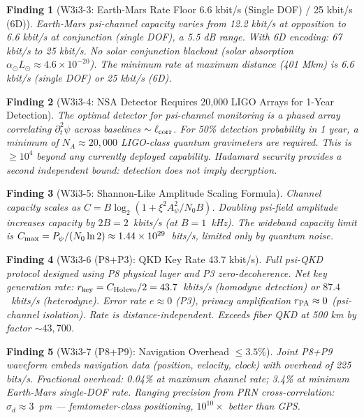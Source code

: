 \documentclass[aps,prd,twocolumn,superscriptaddress,nofootinbib]{revtex4-2}
\newtheorem{finding}{Finding}
\begin{document}
\begin{finding}[W3i3-3: Earth-Mars Rate Floor 6.6 kbit/s (Single DOF) / 25 kbit/s (6D)]
Earth-Mars psi-channel capacity varies from 12.2 kbit/s at opposition
to 6.6 kbit/s at conjunction (single DOF), a 5.5 dB range.
With 6D encoding: 67 kbit/s to 25 kbit/s. No solar conjunction blackout
(solar absorption $\alpha_\odot L_\odot \approx 4.6\times10^{-20}$).
The minimum rate at maximum distance (401 Mkm) is 6.6 kbit/s (single DOF)
or 25 kbit/s (6D).
\end{finding}

\begin{finding}[W3i3-4: NSA Detector Requires 20,000 LIGO Arrays for 1-Year Detection]
The optimal detector for psi-channel monitoring is a phased array
correlating $\partial_t^2\psi$ across baselines $\sim\ell_{\rm corr}$.
For 50\% detection probability in 1 year, a minimum of $N_A \approx 20{,}000$
LIGO-class quantum gravimeters are required. This is $\geq 10^4$ beyond
any currently deployed capability. Hadamard security provides a second
independent bound: detection does not imply decryption.
\end{finding}

\begin{finding}[W3i3-5: Shannon-Like Amplitude Scaling Formula]
Channel capacity scales as $C = B\log_2(1 + \xi^2 A_\psi^2 / N_0 B)$.
Doubling psi-field amplitude increases capacity by $2B = 2$~kbits/s
(at $B = 1$~kHz). The wideband capacity limit is
$C_{\rm max} = P_\psi / (N_0\ln 2) \approx 1.44\times10^{29}$~bits/s,
limited only by quantum noise.
\end{finding}

\begin{finding}[W3i3-6 (P8+P3): QKD Key Rate 43.7 kbit/s]
Full psi-QKD protocol designed using P8 physical layer and P3 zero-decoherence.
Net key generation rate: $r_{\rm key} = C_{\rm Holevo}/2 = 43.7$~kbits/s
(homodyne detection) or $87.4$~kbits/s (heterodyne).
Error rate $e \approx 0$ (P3), privacy amplification $r_{\rm PA} \approx 0$
(psi-channel isolation). Rate is distance-independent.
Exceeds fiber QKD at 500 km by factor $\sim 43{,}700$.
\end{finding}

\begin{finding}[W3i3-7 (P8+P9): Navigation Overhead $\leq 3.5\%$]
Joint P8+P9 waveform embeds navigation data (position, velocity, clock)
with overhead of 225 bits/s. Fractional overhead: 0.04\% at maximum
channel rate; 3.4\% at minimum Earth-Mars single-DOF rate.
Ranging precision from PRN cross-correlation: $\sigma_d \approx 3$~pm
--- femtometer-class positioning, $10^{10}\times$ better than GPS.
\end{finding}
\end{document}
